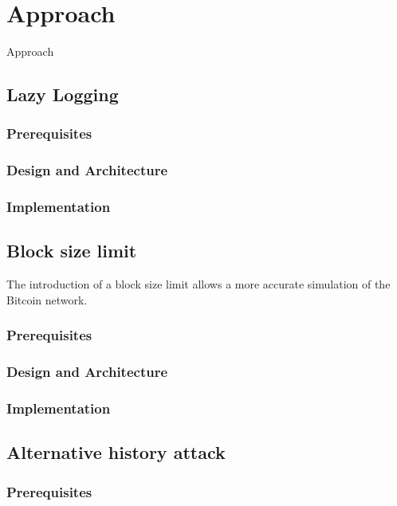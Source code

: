 \chapter{Approach}\label{chapter:approach}
Approach

\section{Lazy Logging}

\subsection{Prerequisites}

\subsection{Design and Architecture}

\subsection{Implementation}

\section{Block size limit}
The introduction of a block size limit allows a more accurate simulation of the Bitcoin network.

\subsection{Prerequisites}

\subsection{Design and Architecture}

\subsection{Implementation}

\section{Alternative history attack}

\subsection{Prerequisites}

